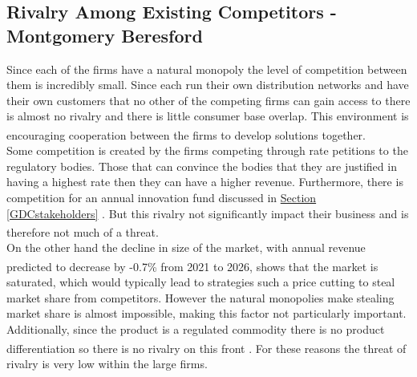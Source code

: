 \documentclass[11pt]{article}		%
\newcommand{\supercite}[1]{\textsuperscript{\cite{#1}}}		%
\newcommand{\sectref}[1]{\hyperref[#1]{Section \ref*{#1}}}     %
\begin{document}
         \subsection[Rivalry Among Existing Competitors]{Rivalry Among Existing Competitors - Montgomery Beresford}
                Since each of the firms have a natural monopoly the level of competition between them is incredibly small. Since each run their own distribution networks and have their own customers that no other of the competing firms can gain access to there is almost no rivalry and there is little consumer base overlap. This environment is encouraging cooperation between the firms to develop solutions together.\supercite{SGN-GD2} 
              \\ \hspace*{3ex}
                Some competition is created by the firms competing through rate petitions to the regulatory bodies. Those that can convince the bodies that they are justified in having a highest rate then they can have a higher revenue. Furthermore, there is competition for an annual innovation fund discussed in \sectref{GDCstakeholders} . But this rivalry not significantly impact their business and is therefore not much of a threat.\supercite{Gas_Distribution_Industry}
               \\ \hspace*{3ex}
                On the other hand the decline in size of the market, with annual revenue predicted to decrease by -0.7\% from 2021 to 2026,\supercite{Gas_Distribution_Industry} shows that the market is saturated, which would typically lead to strategies such a price cutting to steal market share from competitors. However the natural monopolies make stealing market share is almost impossible, making this factor not particularly important. %
                Additionally, since the product is a regulated commodity there is no product differentiation so there is no rivalry on this front .\supercite{Gas_Distribution_Industry}
                For these reasons the threat of rivalry is very low within the large firms. %
\end{document}
